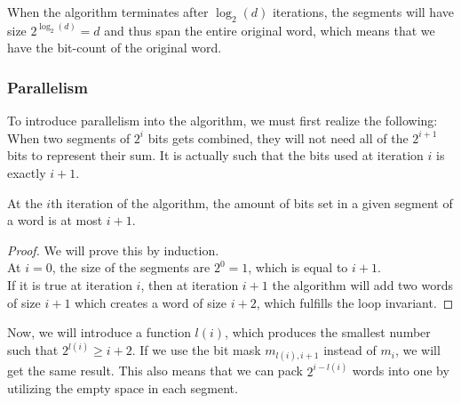 When the algorithm terminates after $\log_2(d)$ iterations, the segments will have size $2^{\log_2{(d)}} = d$ and thus span the entire original word, which means that we have the bit-count of the original word. %
\subsubsection{Parallelism}
To introduce parallelism into the algorithm, we must first realize the following: When two segments of $2^i$ bits gets combined, they will not need all of the $2^{i+1}$ bits to represent their sum. It is actually such that the bits used at iteration $i$ is exactly $i+1$.
\begin{invariant}
    At the $i$th iteration of the algorithm, the amount of bits set in a given segment of a word is at most $i+1$.
\end{invariant}
\begin{proof}
    We will prove this by induction. \\
    At $i=0$, the size of the segments are $2^0 = 1$, which is equal to $i+1$.\\
    If it is true at iteration $i$, then at iteration $i+1$ the algorithm will add two words of size $i+1$ which creates a word of size $i+2$, which fulfills the loop invariant.
\end{proof}
Now, we will introduce a function $l(i)$, which produces the smallest number such that $2^{l(i)} \geq i + 2$. If we use the bit mask $m_{l(i), i+1}$ instead of $m_{i}$, we will get the same result. This also means that we can pack $2^{i-l(i)}$ words into one by utilizing the empty space in each segment.
